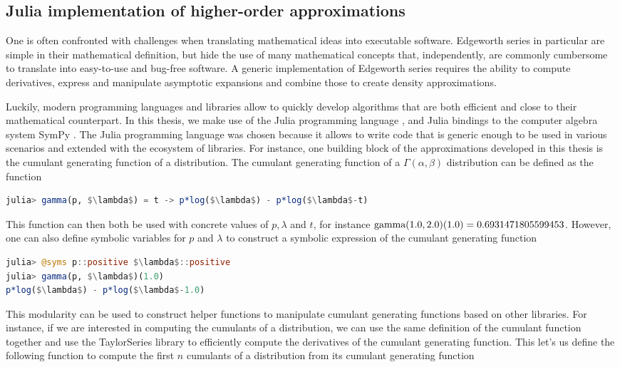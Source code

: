 \subsection{Julia implementation of higher-order approximations}
One is often confronted with challenges when translating mathematical ideas into executable software. Edgeworth series in particular are simple in their mathematical definition, but hide the use of many mathematical concepts that, independently, are commonly cumbersome to translate into easy-to-use and bug-free software. A generic implementation of Edgeworth series requires the ability to compute derivatives, express and manipulate asymptotic expansions and combine those to create density approximations.

Luckily, modern programming languages and libraries allow to quickly develop algorithms that are both efficient and close to their mathematical counterpart. In this thesis, we make use of the Julia programming language \cite{bezanson2017julia}, and Julia bindings to the computer algebra system SymPy \cite{sympy}. The Julia programming language was chosen because it allows to write code that is generic enough to be used in various scenarios and extended with the ecosystem of libraries. For instance, one building block of the approximations developed in this thesis is the cumulant generating function of a distribution. The cumulant generating function of a $\Gamma(\alpha, \beta)$ distribution can be defined as the function
\begin{lstlisting}[language=Julia, mathescape, escapechar=\%]
julia> gamma(p, $\lambda$) = t -> p*log($\lambda$) - p*log($\lambda$-t)
\end{lstlisting}
This function can then both be used with concrete values of $p, \lambda$ and $t$, for instance ${\textrm{gamma}}(1.0, 2.0)(1.0) = 0.6931471805599453$. However, one can also define symbolic variables for $p$ and $\lambda$ to construct a symbolic expression of the cumulant generating function
\begin{lstlisting}[language=Julia, mathescape, escapechar=\%]
julia> @syms p::positive $\lambda$::positive
julia> gamma(p, $\lambda$)(1.0)
p*log($\lambda$) - p*log($\lambda$-1.0)
\end{lstlisting}
This modularity can be used to construct helper functions to manipulate cumulant generating functions based on other libraries. For instance, if we are interested in computing the cumulants of a distribution, we can use the same definition of the cumulant function together and use the TaylorSeries \cite{TaylorSeries} library to efficiently compute the derivatives of the cumulant generating function. This let's us define the following function to compute the first $n$ cumulants of a distribution from its cumulant generating function
